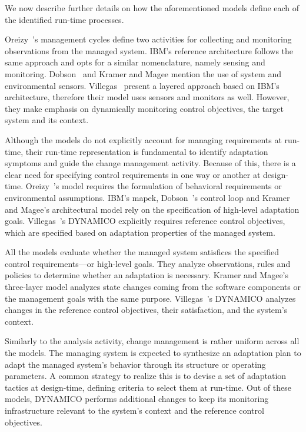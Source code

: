 We now describe further details on how the aforementioned models define each of the identified run-time processes.

\begin{description}[style=unboxed,leftmargin=0cm,font=\bfseries\normalsize]
	\item[Measurement] Oreizy~\etal{}'s management cycles define two activities for collecting and monitoring observations from the managed system. IBM's reference architecture follows the same approach and opts for a similar nomenclature, namely sensing and monitoring. Dobson~\etal{} and Kramer and Magee mention the use of system and environmental sensors. Villegas~\etal{} present a layered approach based on IBM's architecture, therefore their model uses sensors and monitors as well. However, they make emphasis on dynamically monitoring control objectives, the target system and its context.

	\item[Requirements management] Although the models do not explicitly account for managing requirements at run-time, their run-time representation is fundamental to identify adaptation symptoms and guide the change management activity. Because of this, there is a clear need for specifying control requirements in one way or another at design-time. Oreizy~\etal{}'s model requires the formulation of behavioral requirements or environmental assumptions. IBM's \gls{mapek}, Dobson~\etal{}'s control loop and Kramer and Magee's architectural model rely on the specification of high-level adaptation goals. Villegas~\etal{}'s DYNAMICO explicitly requires reference control objectives, which are specified based on adaptation properties of the managed system.

	\item[Analysis] All the models evaluate whether the managed system satisfices the specified control requirements---or high-level goals. They analyze observations, rules and policies to determine whether an adaptation is necessary. Kramer and Magee's three-layer model analyzes state changes coming from the software components or the management goals with the same purpose. Villegas~\etal{}'s DYNAMICO analyzes changes in the reference control objectives, their satisfaction, and the system's context.

	\item[Change management] Similarly to the analysis activity, change management is rather uniform across all the models. The managing system is expected to synthesize an adaptation plan to adapt the managed system's behavior through its structure or operating parameters. A common strategy to realize this is to devise a set of adaptation tactics at design-time, defining criteria to select them at run-time. Out of these models, DYNAMICO performs additional changes to keep its monitoring infrastructure relevant to the system's context and the reference control objectives.


\end{description}
